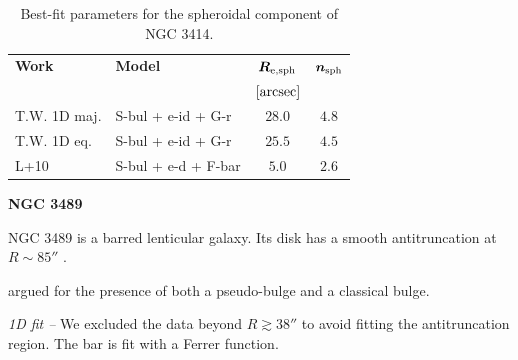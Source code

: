 \documentclass[preprint2]{emulateapj}
\begin{document}
  \begin{table}[h]
  \small
  \caption{Best-fit parameters for the spheroidal component of NGC 3414.}
  \begin{center}
  \begin{tabular}{llcc}
  \hline
  {\bf Work} & {\bf Model}   & $\bm R_{\rm e,sph}$    & $\bm n_{\rm sph}$ \\
    &  &  $[\rm arcsec]$ & \\
  \hline
  T.W. 1D maj. & S-bul + e-id + G-r & $28.0$  &  $4.8$ \\
  T.W. 1D eq.  & S-bul + e-id + G-r & $25.5$  &  $4.5$ \\
  \hline
  L+10         & S-bul + e-d + F-bar	  & $5.0$  &  $2.6$ \\
  \hline
  \end{tabular}
  \end{center}
  \label{tab:n3414}
  \end{table}


  \clearpage\newpage\noindent
  {\bf NGC 3489 \\}

  NGC 3489 is a barred lenticular galaxy. 
  Its disk has a smooth antitruncation at $R \sim 85''$ \citep{erwin2008}.

  \cite{nowak2010n3368n3489} argued for the presence of both a pseudo-bulge and a classical bulge. 

  \emph{1D fit -- }
  We excluded the data beyond $R \gtrsim 38''$ to avoid fitting the antitruncation region.
  The bar is fit with a Ferrer function.
\end{document}

